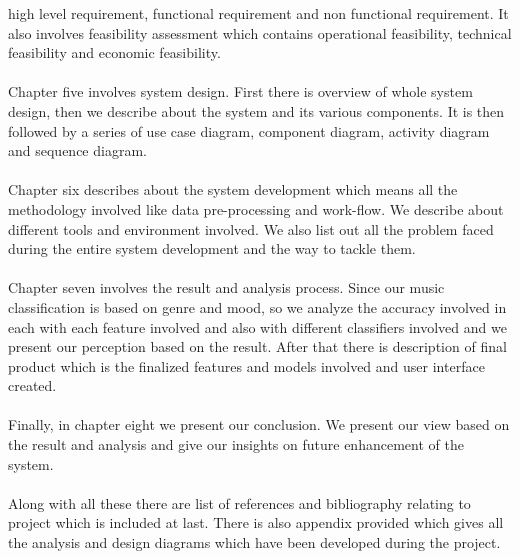 high level requirement, functional requirement and non functional requirement. It also involves feasibility assessment which contains operational feasibility, 
technical feasibility and economic feasibility.\\
\\
Chapter five involves system design. First there is overview of whole system design, then we describe about the system and its various components. It is then followed
by a series of use case diagram, component diagram, activity diagram and sequence diagram.\\
\\
Chapter six describes about the system development which means all the methodology involved like data pre-processing and work-flow. We describe about different tools and environment involved.
We also list out all the problem faced during the entire system development and the way to tackle them.\\
\\
Chapter seven involves the result and analysis process. Since our music classification is based on genre and mood, so we analyze the accuracy involved in each with each feature involved and also with 
different classifiers involved and we present our perception based on the result. After that there is description of final product which is the finalized features and models involved and user interface
created.\\
\\
Finally, in chapter eight we present our conclusion. We present our view based on the result and analysis and give our insights on future enhancement of the system.\\
\\
Along with all these there are list of references and bibliography relating to project which is included at last. There is also appendix provided which gives all the analysis
and design diagrams which have been developed during the project.\\

